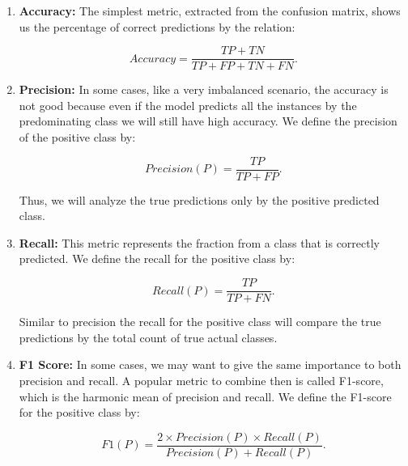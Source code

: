 	\begin{enumerate}
		\item \textbf{Accuracy:} The simplest metric, extracted from the confusion matrix, shows us the percentage of correct predictions by the relation:
		
		\begin{equation}
			Accuracy = \frac{TP + TN}{TP + FP + TN + FN} \text{.}
		\end{equation}
		
		\item \textbf{Precision:} In some cases, like a very imbalanced scenario, the accuracy is not good because even if the model predicts all the instances by the predominating class we will still have high accuracy. We define the precision of the positive class by:
		
		\begin{equation}
			Precision(P) = \frac{TP}{TP + FP} \text{.}
		\end{equation}
	
		Thus, we will analyze the true predictions only by the positive predicted class.
		
		\item \textbf{Recall:} This metric represents the fraction from a class that is correctly predicted. We define the recall for the positive class by:
		
		\begin{equation}
			Recall(P) = \frac{TP}{TP + FN} \text{.}
		\end{equation}
		
		Similar to precision the recall for the positive class will compare the true predictions by the total count of true actual classes.
		
		\item \textbf{F1 Score:} In some cases, we may want to give the same importance to both precision and recall. A popular metric to combine then is called F1-score, which is the harmonic mean of precision and recall. We define the F1-score for the positive class by:
		
		\begin{equation}
			F1(P) = \frac{2 \times Precision(P) \times Recall(P)}{Precision(P) + Recall(P)} \text{.}
		\end{equation}
	
	\end{enumerate}
	
	
